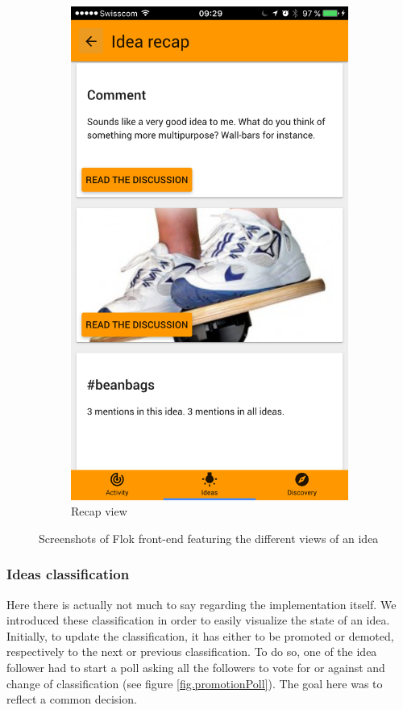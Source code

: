 \documentclass[a4paper,12pt,twoside]{article}
\begin{document}
\begin{figure}[!htb]
\begin{subfigure}[t]{.32\textwidth}
        \includegraphics[width=\textwidth]{images/ideaRecap.png}
        \caption{Recap view}
        \label{fig.idea.recap}
    \end{subfigure}
    \caption{Screenshots of Flok front-end featuring the different views of an idea}
    \label{fig.idea}
\end{figure}

\FloatBarrier
\subsubsection{Ideas classification}
\label{sec.ideasClassification}
Here there is actually not much to say regarding the implementation itself.
We introduced these classification in order to easily visualize the state of an idea.
Initially, to update the classification, it has either to be promoted or demoted, respectively to the next or previous classification.
To do so, one of the idea follower had to start a poll asking all the followers to vote for or against and change of classification (see figure \ref{fig.promotionPoll}).
The goal here was to reflect a common decision.
\end{document}
